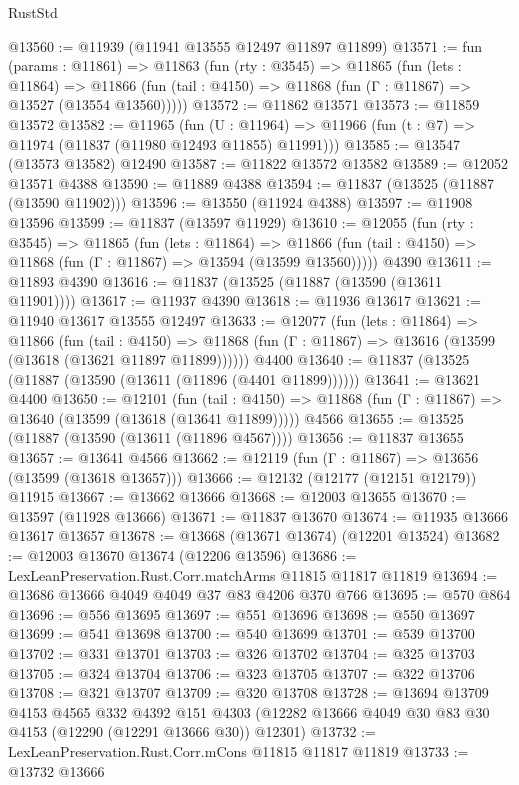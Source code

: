\begin{lexlean}{RustStd}
\begin{coremodule}
{\begin{coremodule}
{{{{{{{{{{{{{{{{{{{{{{{{{{{{{{{{{{{{{{{{{{{{{{{{{{@13560 := @11939 (@11941 @13555 @12497 @11897 @11899)
@13571 := fun (params : @11861) =>
  @11863
    (fun (rty : @3545) =>
    @11865
      (fun (lets : @11864) =>
      @11866 (fun (tail : @4150) => @11868 (fun (Γ : @11867) => @13527 (@13554 @13560)))))
@13572 := @11862 @13571
@13573 := @11859 @13572
@13582 := @11965
    (fun (U : @11964) => @11966 (fun (t : @7) => @11974 (@11837 (@11980 @12493 @11855) @11991)))
@13585 := @13547 (@13573 @13582) @12490
@13587 := @11822 @13572 @13582
@13589 := @12052 @13571 @4388
@13590 := @11889 @4388
@13594 := @11837 (@13525 (@11887 (@13590 @11902)))
@13596 := @13550 (@11924 @4388)
@13597 := @11908 @13596
@13599 := @11837 (@13597 @11929)
@13610 := @12055
    (fun (rty : @3545) =>
    @11865
      (fun (lets : @11864) =>
      @11866 (fun (tail : @4150) => @11868 (fun (Γ : @11867) => @13594 (@13599 @13560)))))
    @4390
@13611 := @11893 @4390
@13616 := @11837 (@13525 (@11887 (@13590 (@13611 @11901))))
@13617 := @11937 @4390
@13618 := @11936 @13617
@13621 := @11940 @13617 @13555 @12497
@13633 := @12077
    (fun (lets : @11864) =>
    @11866
      (fun (tail : @4150) =>
      @11868 (fun (Γ : @11867) => @13616 (@13599 (@13618 (@13621 @11897 @11899))))))
    @4400
@13640 := @11837 (@13525 (@11887 (@13590 (@13611 (@11896 (@4401 @11899))))))
@13641 := @13621 @4400
@13650 := @12101
    (fun (tail : @4150) => @11868 (fun (Γ : @11867) => @13640 (@13599 (@13618 (@13641 @11899)))))
    @4566
@13655 := @13525 (@11887 (@13590 (@13611 (@11896 @4567))))
@13656 := @11837 @13655
@13657 := @13641 @4566
@13662 := @12119 (fun (Γ : @11867) => @13656 (@13599 (@13618 @13657)))
@13666 := @12132 (@12177 (@12151 @12179)) @11915
@13667 := @13662 @13666
@13668 := @12003 @13655
@13670 := @13597 (@11928 @13666)
@13671 := @11837 @13670
@13674 := @11935 @13666 @13617 @13657
@13678 := @13668 (@13671 @13674) (@12201 @13524)
@13682 := @12003 @13670 @13674 (@12206 @13596)
@13686 := LexLeanPreservation.Rust.Corr.matchArms @11815 @11817 @11819
@13694 := @13686 @13666 @4049 @4049 @37 @83 @4206 @370 @766
@13695 := @570 @864
@13696 := @556 @13695
@13697 := @551 @13696
@13698 := @550 @13697
@13699 := @541 @13698
@13700 := @540 @13699
@13701 := @539 @13700
@13702 := @331 @13701
@13703 := @326 @13702
@13704 := @325 @13703
@13705 := @324 @13704
@13706 := @323 @13705
@13707 := @322 @13706
@13708 := @321 @13707
@13709 := @320 @13708
@13728 := @13694
    @13709
    @4153
    @4565
    @332
    @4392
    @151
    @4303
    (@12282 @13666 @4049 @30 @83 @30 @4153 (@12290 (@12291 @13666 @30)) @12301)
@13732 := LexLeanPreservation.Rust.Corr.mCons @11815 @11817 @11819
@13733 := @13732 @13666
}}}}}}}}}}}}}}}}}}}}}}}}}}}}}}}}}}}}}}}}}}}}}}}}}}
\end{coremodule}}
\end{coremodule}
\end{lexlean}
